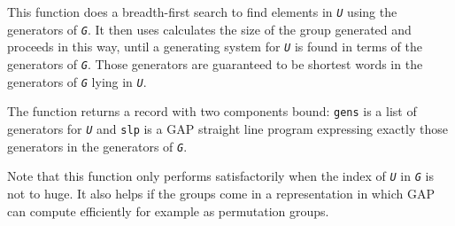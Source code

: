 \documentclass[a4paper,11pt]{report}
\begin{document}
{{{ This function does a breadth-first search to find elements in \mbox{\texttt{\mdseries\slshape U}} using the generators of \mbox{\texttt{\mdseries\slshape G}}. It then uses calculates the size of the group generated and proceeds in this
way, until a generating system for \mbox{\texttt{\mdseries\slshape U}} is found in terms of the generators of \mbox{\texttt{\mdseries\slshape G}}. Those generators are guaranteed to be shortest words in the generators of \mbox{\texttt{\mdseries\slshape G}} lying in \mbox{\texttt{\mdseries\slshape U}}. 

 The function returns a record with two components bound: \texttt{gens} is a list of generators for \mbox{\texttt{\mdseries\slshape U}} and \texttt{slp} is a \textsf{GAP} straight line program expressing exactly those generators in the generators of \mbox{\texttt{\mdseries\slshape G}}. 

 Note that this function only performs satisfactorily when the index of \mbox{\texttt{\mdseries\slshape U}} in \mbox{\texttt{\mdseries\slshape G}} is not to huge. It also helps if the groups come in a representation in which \textsf{GAP} can compute efficiently for example as permutation groups. }

 }

  }

  
\end{document}
